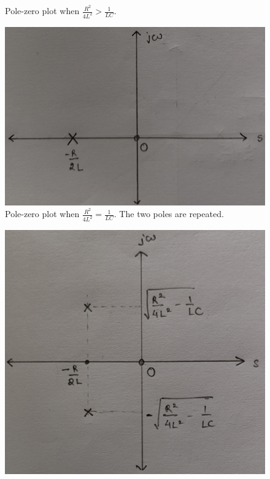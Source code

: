 \documentclass[journal,12pt,twocolumn]{IEEEtran}
\begin{document}
\begin{enumerate}[label=\theenumi.]
\begin{figure}[!ht]
        \caption{Pole-zero plot when \(\frac{R^2}{4L^2} > \frac{1}{LC}\).}
        \label{fig:pole-zero-overdamping}
    \end{figure}
    \begin{figure}[!ht]
        \centering
        \includegraphics[width=\columnwidth]{figs/pole-zero-crit.jpg}
        \caption{Pole-zero plot when \(\frac{R^2}{4L^2} = \frac{1}{LC}\). The
        two poles are repeated.}
        \label{fig:pole-zero-crit}
    \end{figure}
    \begin{figure}[!ht]
        \centering
        \includegraphics[width=\columnwidth]{figs/pole-zero-underdamping.jpg}

\end{figure}
\end{enumerate}
\end{document}
